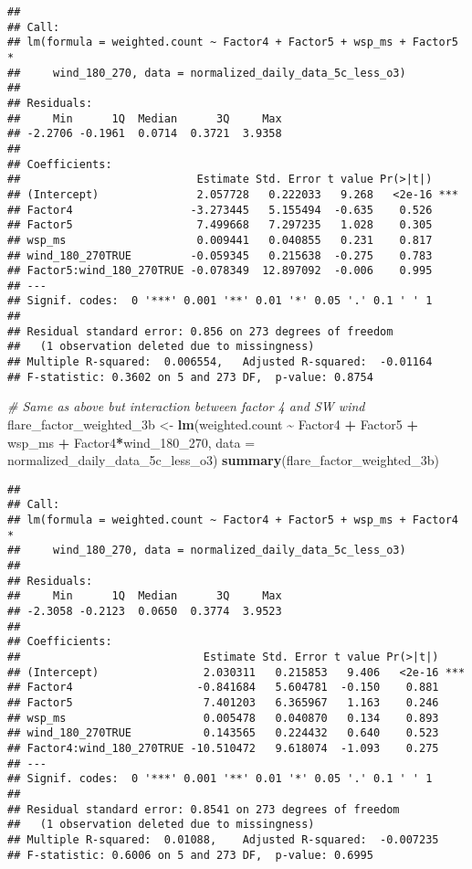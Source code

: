 \documentclass[
]{article}
\newenvironment{Shaded}{\begin{snugshade}}{\end{snugshade}}
\newcommand{\AttributeTok}[1]{\textcolor[rgb]{0.13,0.29,0.53}{#1}}
\newcommand{\CommentTok}[1]{\textcolor[rgb]{0.56,0.35,0.01}{\textit{#1}}}
\newcommand{\FunctionTok}[1]{\textcolor[rgb]{0.13,0.29,0.53}{\textbf{#1}}}
\newcommand{\NormalTok}[1]{#1}
\newcommand{\OtherTok}[1]{\textcolor[rgb]{0.56,0.35,0.01}{#1}}
\newcommand{\SpecialCharTok}[1]{\textcolor[rgb]{0.81,0.36,0.00}{\textbf{#1}}}
\begin{document}
\begin{verbatim}
## 
## Call:
## lm(formula = weighted.count ~ Factor4 + Factor5 + wsp_ms + Factor5 * 
##     wind_180_270, data = normalized_daily_data_5c_less_o3)
## 
## Residuals:
##     Min      1Q  Median      3Q     Max 
## -2.2706 -0.1961  0.0714  0.3721  3.9358 
## 
## Coefficients:
##                           Estimate Std. Error t value Pr(>|t|)    
## (Intercept)               2.057728   0.222033   9.268   <2e-16 ***
## Factor4                  -3.273445   5.155494  -0.635    0.526    
## Factor5                   7.499668   7.297235   1.028    0.305    
## wsp_ms                    0.009441   0.040855   0.231    0.817    
## wind_180_270TRUE         -0.059345   0.215638  -0.275    0.783    
## Factor5:wind_180_270TRUE -0.078349  12.897092  -0.006    0.995    
## ---
## Signif. codes:  0 '***' 0.001 '**' 0.01 '*' 0.05 '.' 0.1 ' ' 1
## 
## Residual standard error: 0.856 on 273 degrees of freedom
##   (1 observation deleted due to missingness)
## Multiple R-squared:  0.006554,   Adjusted R-squared:  -0.01164 
## F-statistic: 0.3602 on 5 and 273 DF,  p-value: 0.8754
\end{verbatim}

\begin{Shaded}
\begin{Highlighting}[]
\CommentTok{\# Same as above but interaction between factor 4 and SW wind}
\NormalTok{flare\_factor\_weighted\_3b }\OtherTok{\textless{}{-}} \FunctionTok{lm}\NormalTok{(weighted.count }\SpecialCharTok{\textasciitilde{}}\NormalTok{ Factor4 }\SpecialCharTok{+}\NormalTok{ Factor5 }\SpecialCharTok{+}\NormalTok{ wsp\_ms }\SpecialCharTok{+} 
\NormalTok{                                 Factor4}\SpecialCharTok{*}\NormalTok{wind\_180\_270, }
                               \AttributeTok{data =}\NormalTok{ normalized\_daily\_data\_5c\_less\_o3)}
\FunctionTok{summary}\NormalTok{(flare\_factor\_weighted\_3b)}
\end{Highlighting}
\end{Shaded}

\begin{verbatim}
## 
## Call:
## lm(formula = weighted.count ~ Factor4 + Factor5 + wsp_ms + Factor4 * 
##     wind_180_270, data = normalized_daily_data_5c_less_o3)
## 
## Residuals:
##     Min      1Q  Median      3Q     Max 
## -2.3058 -0.2123  0.0650  0.3774  3.9523 
## 
## Coefficients:
##                            Estimate Std. Error t value Pr(>|t|)    
## (Intercept)                2.030311   0.215853   9.406   <2e-16 ***
## Factor4                   -0.841684   5.604781  -0.150    0.881    
## Factor5                    7.401203   6.365967   1.163    0.246    
## wsp_ms                     0.005478   0.040870   0.134    0.893    
## wind_180_270TRUE           0.143565   0.224432   0.640    0.523    
## Factor4:wind_180_270TRUE -10.510472   9.618074  -1.093    0.275    
## ---
## Signif. codes:  0 '***' 0.001 '**' 0.01 '*' 0.05 '.' 0.1 ' ' 1
## 
## Residual standard error: 0.8541 on 273 degrees of freedom
##   (1 observation deleted due to missingness)
## Multiple R-squared:  0.01088,    Adjusted R-squared:  -0.007235 
## F-statistic: 0.6006 on 5 and 273 DF,  p-value: 0.6995
\end{verbatim}
\end{document}
